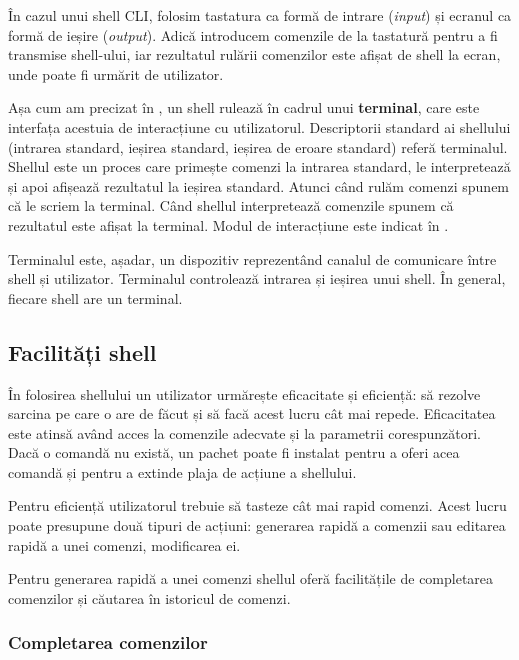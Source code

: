 În cazul unui shell CLI, folosim tastatura ca formă de intrare (\textit{input}) și ecranul ca formă de ieșire (\textit{output}). Adică introducem comenzile de la tastatură pentru a fi transmise shell-ului, iar rezultatul rulării comenzilor este afișat de shell la ecran, unde poate fi urmărit de utilizator.

Așa cum am precizat în , un shell rulează în cadrul unui \textbf{terminal}, care este interfața acestuia de
interacțiune cu utilizatorul. Descriptorii standard ai shellului (intrarea standard, ieșirea standard, ieșirea de eroare standard) referă terminalul.
Shellul este un proces care primește comenzi la intrarea standard, le
interpretează și apoi afișează rezultatul la ieșirea standard. Atunci când rulăm
comenzi spunem că le scriem la terminal. Când shellul interpretează comenzile
spunem că rezultatul este afișat la terminal. Modul de interacțiune este indicat în .

Terminalul este, așadar, un dispozitiv reprezentând canalul de comunicare între shell și
utilizator. Terminalul controlează intrarea și ieșirea unui shell. În general,
fiecare shell are un terminal.

\subsection{Facilități shell}
\label{sec:cli:shell:features}

În folosirea shellului un utilizator urmărește eficacitate și eficiență: să
rezolve sarcina pe care o are de făcut și să facă acest lucru cât mai repede.
Eficacitatea este atinsă având acces la comenzile adecvate și la parametrii
corespunzători. Dacă o comandă nu există, un pachet poate fi instalat pentru a
oferi acea comandă și pentru a extinde plaja de acțiune a shellului.

Pentru eficiență utilizatorul trebuie să tasteze cât mai rapid comenzi. Acest
lucru poate presupune două tipuri de acțiuni: generarea rapidă a comenzii sau
editarea rapidă a unei comenzi, modificarea ei.

Pentru generarea rapidă a unei comenzi shellul oferă facilitățile de completarea comenzilor și căutarea în istoricul de comenzi.

\subsubsection{Completarea comenzilor}
\label{sec:cli:shell:features:completion}

